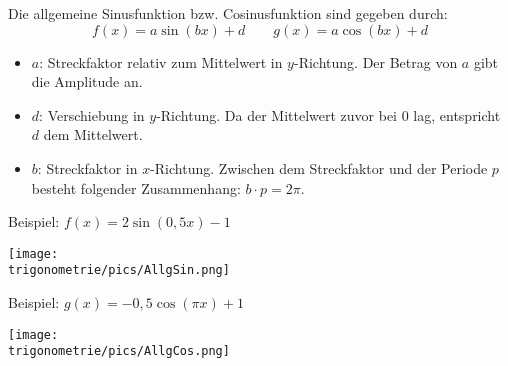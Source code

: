Die allgemeine Sinusfunktion bzw. Cosinusfunktion sind gegeben durch:
\[f(x)=a\sin\left(bx\right)+d\qquad g(x)=a\cos\left(bx\right)+d\]
\begin{itemize}
	\item \(a\): \textcolor{loes}{Streckfaktor relativ zum Mittelwert in \(y\)-Richtung. Der Betrag von \(a\) gibt die Amplitude an.}

    \bigskip

	\item \(d\): \textcolor{loes}{Verschiebung in \(y\)-Richtung. Da der Mittelwert zuvor bei \(0\) lag, entspricht \(d\) dem Mittelwert.}

    \bigskip

	\item \(b\): \textcolor{loes}{Streckfaktor in \(x\)-Richtung. Zwischen dem Streckfaktor und der Periode \(p\) besteht folgender Zusammenhang: \(b\cdot p=2\pi\).}

    \bigskip

\end{itemize}

\bigskip

Beispiel: \(\displaystyle f(x)=2\sin\left(0,5x\right)-1\)

\medskip

\begin{minipage}{\textwidth}
	\texttt{[image: \\trigonometrie/pics/AllgSin.png]}
\end{minipage}

\vspace{2cm}

Beispiel: \(\displaystyle g(x)=-0,5\cos\left(\pi x\right)+1\)

\medskip

\begin{minipage}{\textwidth}
	\texttt{[image: \\trigonometrie/pics/AllgCos.png]}
\end{minipage}
\newpage

